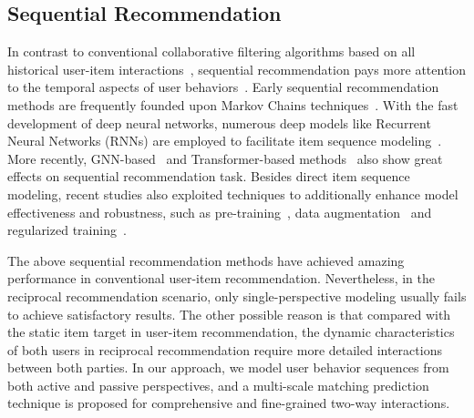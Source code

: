 \subsection{Sequential Recommendation} \label{sec:seqrec}
In contrast to conventional collaborative filtering algorithms based on all historical user-item interactions~\cite{koren2008factorization,kabbur2013fism,he2018nais,rendle2009bpr,he2017neural,he2020lightgcn}, sequential recommendation pays more attention to the temporal aspects of user behaviors~\cite{hidasi2015session,sun2019bert4rec,kang2018self}.
Early sequential recommendation methods are frequently founded upon Markov Chains techniques~\cite{rendle2010factorizing,he2016fusing}. With the fast development of deep neural networks, numerous deep models like Recurrent Neural Networks (RNNs) are employed to facilitate item sequence modeling~\cite{hidasi2015session,tang2018personalized,yuan2019simple}. 
More recently, GNN-based~\cite{wu2019session,xu2019graph} and Transformer-based methods~\cite{kang2018self,sun2019bert4rec,hou2022core} also show great effects on sequential recommendation task. 
Besides direct item sequence modeling, recent studies also exploited techniques to additionally enhance model effectiveness and robustness, such as pre-training~\cite{zhou2020s3,hou2022towards}, data augmentation~\cite{wang2021counterfactual} and regularized training~\cite{xie2022cl4rec,zhou2023mvs}.

The above sequential recommendation methods
have achieved amazing performance in conventional user-item recommendation. 
Nevertheless, in the reciprocal recommendation scenario, only single-perspective modeling usually fails to achieve satisfactory results. 
The other possible reason is that compared with the static item target in user-item recommendation, the dynamic characteristics of both users in reciprocal recommendation require more detailed interactions between both parties.
In our approach, we model user behavior sequences from both active and passive perspectives, and a multi-scale matching prediction technique is proposed for comprehensive and fine-grained two-way interactions.

